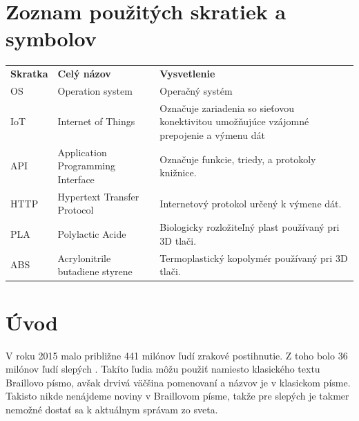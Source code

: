 \documentclass{template/socthesis}
\author{Juraj Kulich}
\begin{document}
\maketitle
	\restoregeometry



\tableofcontents
\thispagestyle{empty}

\chapter*{Zoznam použitých skratiek a symbolov}
\thispagestyle{empty} %

\begin{adjustbox}{width=1\textwidth}
\begin{tabularx}{\textwidth}{llX }
	\textbf{Skratka} & \textbf{Celý názov} & \textbf{Vysvetlenie} \\
	OS & Operation system & Operačný systém \\
	IoT              & Internet of Things  & Označuje zariadenia	so sieťovou konektivitou umožňujúce vzájomné prepojenie a výmenu dát  \\
	API & Application Programming Interface & Označuje funkcie, triedy, a protokoly knižnice. \\
	HTTP & Hypertext Transfer Protocol & Internetový protokol určený k výmene dát. \\
	PLA & Polylactic Acide & Biologicky rozložiteľný plast používaný pri 3D tlači. \\
	ABS & Acrylonitrile butadiene styrene & Termoplastický kopolymér používaný pri 3D tlači.
	
\end{tabularx}
\end{adjustbox}

\chapter*{Úvod}
V roku 2015 malo približne 441 milónov ľudí zrakové postihnutie. Z toho bolo 36 milónov ľudí slepých \cite{bourne2017magnitude}. Takíto ľudia môžu použiť namiesto klasického textu Braillovo písmo, avšak drvivá väčšina pomenovaní a názvov je v klasickom písme. Takisto nikde nenájdeme noviny v Braillovom písme, takže pre slepých je takmer nemožné dostať sa k aktuálnym správam zo sveta.
\end{document}
